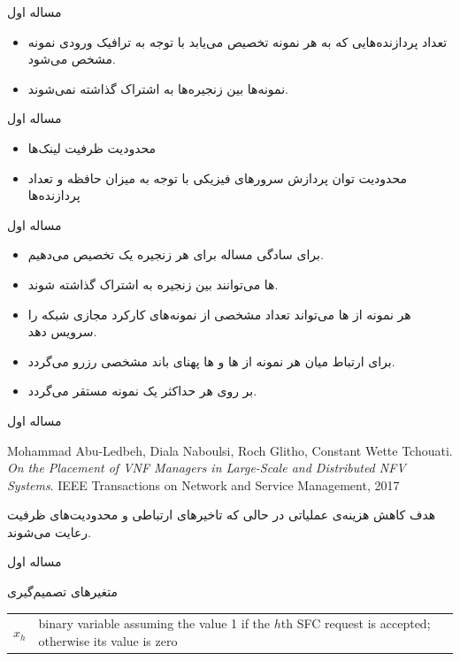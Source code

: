 \documentclass{beamer}
\makeatletter
\newcommand{\RTList}{\raggedleft\rightskip\@totalleftmargin}
\makeatother
\begin{document}
\begin{persian}
\begin{frame}{مساله اول}
\begin{itemize}
		\item تعداد پردازنده‌هایی که به هر نمونه تخصیص می‌یابد با توجه به ترافیک ورودی نمونه مشخص می‌شود.
		\item نمونه‌ها بین زنجیره‌ها به اشتراک گذاشته نمی‌شوند.
	\end{itemize}
\end{frame}
\begin{frame}{مساله اول}
	\begin{itemize}\RTList
		\item محدودیت ظرفیت لینک‌ها
		\item محدودیت توان پردازش سرورهای فیزیکی با توجه به میزان حافظه و تعداد پردازنده‌ها
	\end{itemize}
\end{frame}
\begin{frame}{مساله اول}
	\begin{itemize}\RTList
		\item برای سادگی مساله برای هر زنجیره یک  تخصیص می‌دهیم.
		\item {}ها می‌توانند بین زنجیره به اشتراک گذاشته شوند.
		\item هر نمونه از ها می‌تواند تعداد مشخصی از نمونه‌های کارکرد مجازی شبکه را سرویس دهد. 
		\item برای ارتباط میان هر نمونه از ها و ها پهنای باند مشخصی رزرو می‌گردد.
		\item بر روی هر  حداکثر یک نمونه  مستقر می‌گردد.
	\end{itemize}
\end{frame}
\begin{frame}{مساله اول}
	\begin{latin}\begin{thebibliography}{9}
		Mohammad Abu-Ledbeh, Diala Naboulsi, Roch Glitho, Constant Wette Tchouati.
		\textit{On the Placement of VNF Managers in Large-Scale and Distributed NFV Systems}. 
		IEEE Transactions on Network and Service Management, 2017
	\end{thebibliography}\end{latin}
	\par
	هدف کاهش هزینه‌ی عملیاتی در حالی که تاخیرهای ارتباطی و محدودیت‌های ظرفیت رعایت می‌شوند.
\end{frame}
\begin{frame}{مساله اول}
	\par
	متغیرهای تصمیم‌گیری
	\begin{latin}\begin{tabular}{c p{10cm}}
		$x_h$ & binary variable assuming the value 1 if the $h$th SFC request is accepted; otherwise its value is zero \\

\end{tabular}
\end{latin}
\end{frame}
\end{persian}
\end{document}
